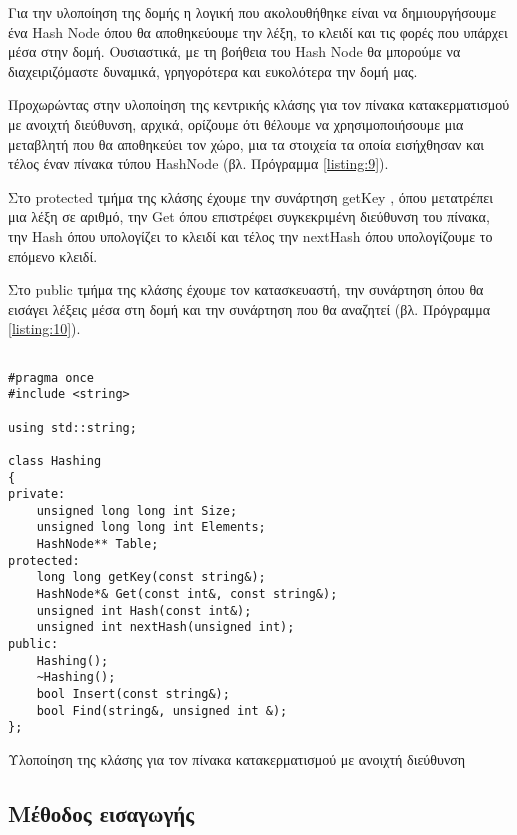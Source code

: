 Για την υλοποίηση της δομής η λογική που ακολουθήθηκε είναι να δημιουργήσουμε ένα  \en Hash Node \gr όπου θα αποθηκεύουμε την λέξη, το κλειδί και τις φορές που υπάρχει μέσα στην δομή. Ουσιαστικά, με τη βοήθεια του \en Hash Node \gr θα μπορούμε να διαχειριζόμαστε δυναμικά, γρηγορότερα και ευκολότερα την δομή μας.

Προχωρώντας στην υλοποίηση της κεντρικής κλάσης για τον πίνακα κατακερματισμού με ανοιχτή διεύθυνση, αρχικά, ορίζουμε ότι θέλουμε να χρησιμοποιήσουμε μια μεταβλητή που θα αποθηκεύει τον χώρο, μια τα στοιχεία τα οποία εισήχθησαν και τέλος έναν πίνακα τύπου \en HashNode \gr (βλ. Πρόγραμμα \ref{listing:9}).

Στο \en protected \gr τμήμα της κλάσης έχουμε την συνάρτηση \en getKey \gr, όπου μετατρέπει μια λέξη σε αριθμό, την \en Get \gr όπου επιστρέφει συγκεκριμένη διεύθυνση του πίνακα, την \en Hash \gr όπου υπολογίζει το κλειδί και τέλος την \en nextHash \gr όπου υπολογίζουμε το επόμενο κλειδί.

Στο \en public \gr τμήμα της κλάσης έχουμε τον κατασκευαστή, την συνάρτηση όπου θα εισάγει λέξεις μέσα στη δομή και την συνάρτηση που θα αναζητεί (βλ. Πρόγραμμα \ref{listing:10}).

\en
\begin{listing}[ht]
\begin{verbatim}

#pragma once
#include <string>

using std::string;

class Hashing
{
private:
    unsigned long long int Size;
    unsigned long long int Elements;
    HashNode** Table;
protected:
    long long getKey(const string&);
    HashNode*& Get(const int&, const string&);
    unsigned int Hash(const int&);
    unsigned int nextHash(unsigned int);
public:
    Hashing();
    ~Hashing();
    bool Insert(const string&);
    bool Find(string&, unsigned int &);
};

\end{verbatim}
\caption{Υλοποίηση της κλάσης για τον πίνακα κατακερματισμού με ανοιχτή διεύθυνση}
\label{listing:10}
\end{listing}
\gr



\subsection{Μέθοδος εισαγωγής}

